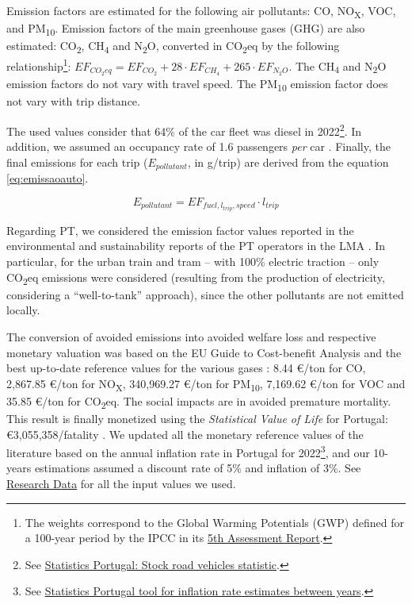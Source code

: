 \documentclass[review, doubleblind, 3p,
authoryear]{elsarticle} %
\begin{document}
Emission factors are estimated for the following air pollutants: CO,
NO\textsubscript{X}, VOC, and PM\textsubscript{10}. Emission factors of
the main greenhouse gases (GHG) are also estimated: CO\textsubscript{2},
CH\textsubscript{4} and N\textsubscript{2}O, converted in
CO\textsubscript{2}eq by the following relationship\footnote{The weights
  correspond to the Global Warming Potentials (GWP) defined for a
  100-year period by the IPCC in its
  \href{https://www.ipcc.ch/report/ar5/}{5th Assessment Report}.}:
\(EF_{CO_2eq} = EF_{CO_2} + 28\cdot EF_{CH_4} + 265\cdot EF_{N_2O}\).
The CH\textsubscript{4} and N\textsubscript{2}O emission factors do not
vary with travel speed. The PM\textsubscript{10} emission factor does
not vary with trip distance.

The used values consider that 64\% of the car fleet was diesel in
2022\footnote{See
  \href{https://smi.ine.pt/Indicador/Detalhes/10837?LANG=EN}{Statistics
  Portugal: Stock road vehicles statistic}.}. In addition, we assumed an
occupancy rate of 1.6 passengers \emph{per} car \citep{IMOB}. Finally,
the final emissions for each trip (\(E_{pollutant}\), in g/trip) are
derived from the equation \ref{eq:emissaoauto}.

\begin{equation}\label{eq:emissaoauto}
{E}_{pollutant} = {EF}_{fuel,l_{trip},speed}\cdot l_{trip}
\end{equation}

Regarding PT, we considered the emission factor values reported in the
environmental and sustainability reports of the PT operators in the LMA
\citep{Carris2019s, Metro2019s, CP2019s, Transtejo2014}. In particular,
for the urban train and tram -- with 100\% electric traction -- only
CO\textsubscript{2}eq emissions were considered (resulting from the
production of electricity, considering a ``well-to-tank'' approach),
since the other pollutants are not emitted locally.

The conversion of avoided emissions into avoided welfare loss and
respective monetary valuation was based on the EU Guide to Cost-benefit
Analysis \citep{EuropeanCommission2014} and the best up-to-date
reference values for the various gases
\citep{EuropeanCommission2014, bickel2006, UNITE}: 8.44 €/ton for CO,
2,867.85 €/ton for NO\textsubscript{X}, 340,969.27 €/ton for
PM\textsubscript{10}, 7,169.62 €/ton for VOC and 35.85 €/ton for
CO\textsubscript{2}eq. The social impacts are in avoided premature
mortality. This result is finally monetized using the \emph{Statistical
Value of Life} for Portugal: €3,055,358/fatality \citep{ANSR2021}. We
updated all the monetary reference values of the literature based on the
annual inflation rate in Portugal for 2022\footnote{See
  \href{https://www.ine.pt/xportal/xmain?xpid=INE&xpgid=ipc}{Statistics
  Portugal tool for inflation rate estimates between years}.}, and our
10-years estimations assumed a discount rate of 5\% and inflation of
3\%. See \hyperref[research-data]{Research Data} for all the input
values we used.
\end{document}
